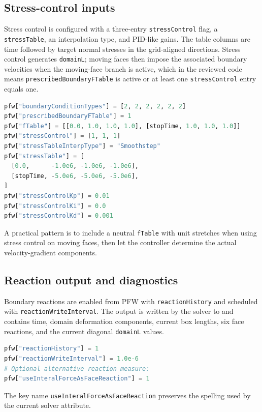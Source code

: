 \subsection{Stress-control inputs}

Stress control is configured with a three-entry \texttt{stressControl} flag, a \texttt{stressTable}, an interpolation type, and PID-like gains.  The table columns are time followed by target normal stresses in the grid-aligned directions.  Stress control generates \texttt{domainL}; moving faces then impose the associated boundary velocities when the moving-face branch is active, which in the reviewed code means \texttt{prescribedBoundaryFTable} is active or at least one \texttt{stressControl} entry equals one.
\begin{lstlisting}[language=Python,caption={Stress-control input pattern.}]
pfw["boundaryConditionTypes"] = [2, 2, 2, 2, 2, 2]
pfw["prescribedBoundaryFTable"] = 1
pfw["fTable"] = [[0.0, 1.0, 1.0, 1.0], [stopTime, 1.0, 1.0, 1.0]]
pfw["stressControl"] = [1, 1, 1]
pfw["stressTableInterpType"] = "Smoothstep"
pfw["stressTable"] = [
  [0.0,      -1.0e6, -1.0e6, -1.0e6],
  [stopTime, -5.0e6, -5.0e6, -5.0e6],
]
pfw["stressControlKp"] = 0.01
pfw["stressControlKi"] = 0.0
pfw["stressControlKd"] = 0.001
\end{lstlisting}
A practical pattern is to include a neutral \texttt{fTable} with unit stretches when using stress control on moving faces, then let the controller determine the actual velocity-gradient components.

\subsection{Reaction output and diagnostics}

Boundary reactions are enabled from PFW with \texttt{reactionHistory} and scheduled with \texttt{reactionWriteInterval}.  The output is written by the solver to  and contains time, domain deformation components, current box lengths, six face reactions, and the current diagonal \texttt{domainL} values.
\begin{lstlisting}[language=Python,caption={Reaction-history controls.}]
pfw["reactionHistory"] = 1
pfw["reactionWriteInterval"] = 1.0e-6
# Optional alternative reaction measure:
pfw["useInteralForceAsFaceReaction"] = 1
\end{lstlisting}
The key name \texttt{useInteralForceAsFaceReaction} preserves the spelling used by the current solver attribute.

